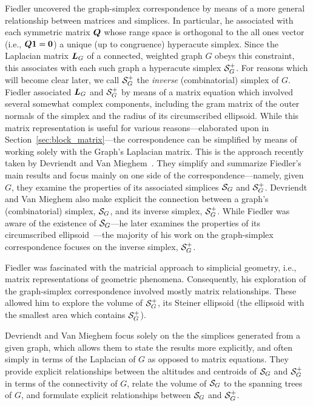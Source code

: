 Fiedler uncovered  the graph-simplex correspondence by means of  a more general  relationship between matrices and simplices.  In particular, he associated with each symmetric matrix $\vb*{Q}$ whose range space is orthogonal to the all ones vector (i.e.,  $\vb*{Q}\vb{1}=\vb{0}$) a unique (up to congruence) hyperacute simplex. Since the Laplacian  matrix  $\vb*{L}_G$ of a connected, weighted graph  $G$ obeys this constraint, this associates with  each such graph a hyperacute simplex  $\mathcal{S}_G^+$.   
For  reasons which will become clear later, we call $\mathcal{S}_G^+$ the \emph{inverse} (combinatorial) simplex of $G$. 
Fiedler associated $\vb*{L}_G$ and $\mathcal{S}_G^+$  by means of a matrix equation which involved several somewhat complex components, including  the gram matrix of the outer normals of the simplex and  the radius of its circumscribed ellipsoid. While this matrix representation is useful for various reasons---elaborated upon in  Section~\ref{sec:block_matrix}---the correspondence can  be simplified  by means of working solely  with the Graph's Laplacian  matrix. This is the approach  recently taken by Devriendt  and  Van  Mieghem~\cite{devriendt2018simplex}. They simplify and summarize Fiedler's main  results and focus mainly on one  side of the correspondence---namely,  given $G$,  they examine  the properties of  its associated  simplices $\mathcal{S}_G$ and $\mathcal{S}_G^+$. 
Devriendt and  Van Mieghem also make explicit the connection between a graph's (combinatorial) simplex, $\mathcal{S}_G$, and  its  inverse  simplex, $\mathcal{S}_G^+$. While Fiedler was aware  of the existence of  $\mathcal{S}_G$---he later examines the properties of its circumscribed ellipsoid~\cite{fiedler2005geometry}---the  majority of his  work on  the graph-simplex  correspondence focuses on the inverse simplex, $\mathcal{S}_G^+$. 

Fiedler was fascinated with the matricial approach to simplicial geometry, i.e., matrix representations of geometric phenomena. Consequently, his exploration of  the  graph-simplex correspondence involved mostly matrix relationships. These  allowed him to explore  the volume of $\mathcal{S}_G^+$, its Steiner ellipsoid (the ellipsoid with  the smallest area which  contains $\mathcal{S}_G^+$). 

Devriendt and Van Mieghem focus solely on the the simplices generated from a given graph, which allows them to state the  results more explicitly, and often simply in  terms of the Laplacian of $G$ as opposed to matrix equations. They provide explicit relationships between the altitudes and centroids of $\mathcal{S}_G$ and $\mathcal{S}_G^+$ in terms of the  connectivity of  $G$, relate the volume of $\mathcal{S}_G$ to the  spanning trees  of $G$,  and formulate explicit relationships between  $\mathcal{S}_G$ and $\mathcal{S}_G^+$. 


